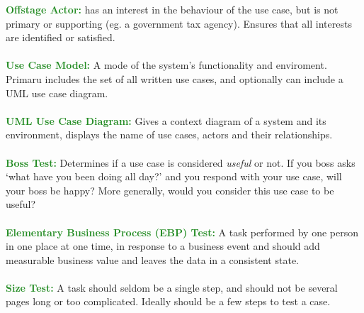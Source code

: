 \documentclass[a4paper,10pt]{article}
\begin{document}
\textcolor{ForestGreen}{\textbf{Offstage Actor:}} has an interest in the behaviour of the use case, but is not primary or supporting (eg. a government tax agency). Ensures that all interests are identified or satisfied.\\\\
\textcolor{ForestGreen}{\textbf{Use Case Model:}} A mode of the system's functionality and enviroment. Primaru includes the set of all written use cases, and optionally can include a UML use case diagram.\\\\
\textcolor{ForestGreen}{\textbf{UML Use Case Diagram:}} Gives a context diagram of a system and its environment, displays the name of use cases, actors and their relationships.\\\\
\textcolor{ForestGreen}{\textbf{Boss Test:}} Determines if a use case is considered \emph{useful} or not. If you boss asks `what have you been doing all day?' and you respond with your use case, will your boss be happy? More generally, would you consider this use case to be useful? \\\\
\textcolor{ForestGreen}{\textbf{Elementary Business Process (EBP) Test:}} A task performed by one person in one place at one time, in response to a business event and should add measurable business value and leaves the data in a consistent state.\\\\
\textcolor{ForestGreen}{\textbf{Size Test:}} A task should seldom be a single step, and should not be several pages long or too complicated. Ideally should be a few steps to test a case.\\\\

\newpage 
\end{document}
